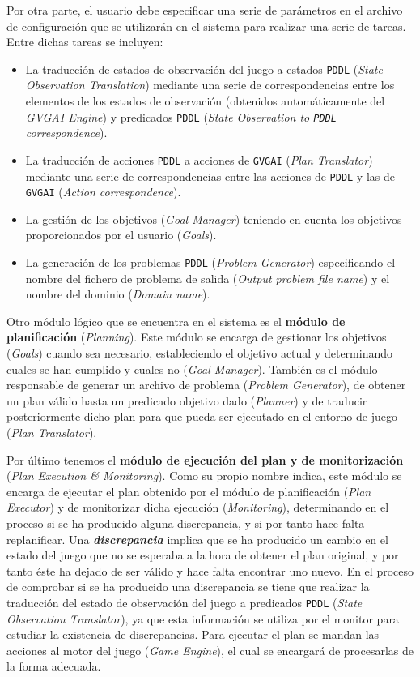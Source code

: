 Por otra parte, el usuario debe especificar una serie de parámetros en el archivo de
configuración que se utilizarán en el sistema para realizar una serie de tareas.
Entre dichas tareas se incluyen:

\begin{itemize}[label=\textbullet]
    \item La traducción de estados de observación del juego a estados \texttt{PDDL}
    (\textit{State Observation Translation}) mediante una serie de correspondencias entre
    los elementos de los estados de observación (obtenidos automáticamente del \textit{GVGAI Engine})
    y predicados \texttt{PDDL} (\textit{State Observation to \texttt{PDDL} correspondence}).
    \item La traducción de acciones \texttt{PDDL} a acciones de \texttt{GVGAI}
    (\textit{Plan Translator}) mediante una serie de correspondencias entre las acciones de
    \texttt{PDDL} y las de \texttt{GVGAI} (\textit{Action correspondence}).
    \item La gestión de los objetivos (\textit{Goal Manager}) teniendo en cuenta los
    objetivos proporcionados por el usuario (\textit{Goals}).
    \item La generación de los problemas \texttt{PDDL} (\textit{Problem Generator})
    especificando el nombre del fichero de problema de salida (\textit{Output problem file name})
    y el nombre del dominio (\textit{Domain name}).
\end{itemize}


Otro módulo lógico que se encuentra en el sistema es el \textbf{módulo de planificación}
(\textit{Planning}). Este módulo se encarga de gestionar los objetivos (\textit{Goals}) cuando
sea necesario, estableciendo el objetivo actual y determinando cuales se han cumplido y cuales no
(\textit{Goal Manager}). También es el módulo responsable de generar un archivo de problema
(\textit{Problem Generator}), de obtener un plan válido hasta un predicado objetivo dado
(\textit{Planner}) y de traducir posteriormente dicho plan para que pueda ser ejecutado
en el entorno de juego (\textit{Plan Translator}).

Por último tenemos el \textbf{módulo de ejecución del plan y de monitorización}
(\textit{Plan Execution \& Monitoring}). Como su propio nombre indica, este módulo
se encarga de ejecutar el plan obtenido por el módulo de planificación (\textit{Plan Executor})
y de monitorizar dicha ejecución (\textit{Monitoring}), determinando en el proceso si se ha
producido alguna discrepancia, y si por tanto hace falta replanificar. Una \textbf{\textit{discrepancia}} implica
que se ha producido un cambio en el estado del juego que no se esperaba a la hora de obtener
el plan original, y por tanto éste ha dejado de ser válido y hace falta encontrar uno nuevo.
En el proceso de comprobar si se ha producido una discrepancia se tiene que realizar la traducción del
estado de observación del juego a predicados \texttt{PDDL} (\textit{State Observation Translator}),
ya que esta información se utiliza por el monitor para estudiar la existencia de discrepancias.
Para ejecutar el plan se mandan las acciones al motor del juego (\textit{Game Engine}), el cual
se encargará de procesarlas de la forma adecuada.

